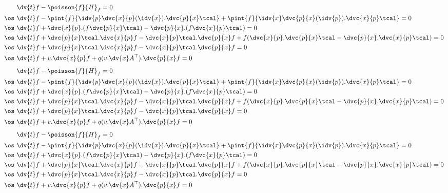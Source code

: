 \begin{align}
	        & \dv{t}f-\poisson{f}{H}_f=0                                                                                                 \\
\os\,\,         & \dv{t}f-\pint{f}{\idv{p}\dvc{x}{p}(\idv{x}).\dvc{p}{x}\tcal}+\pint{f}{\idv{x}\dvc{p}{x}(\idv{p}).\dvc{x}{p}\tcal}=0        \\
\os\,\,         & \dv{t}f+\dvc{x}{p}.(f\dvc{p}{x}\tcal)-\dvc{p}{x}.(f\dvc{x}{p}\tcal)=0                                                      \\
\os\,\,         & \dv{t}f+\dvc{p}{x}\tcal.\dvc{x}{p}f-\dvc{x}{p}\tcal.\dvc{p}{x}f+f(\dvc{x}{p}.\dvc{p}{x}\tcal-\dvc{p}{x}.\dvc{x}{p}\tcal)=0 \\
\os\,\,         & \dv{t}f+\dvc{p}{x}\tcal.\dvc{x}{p}f-\dvc{x}{p}\tcal.\dvc{p}{x}f=0                                                          \\
\os\,\,         & \dv{t}f+v.\dvc{x}{p}f+q(v.\dv{x}A^\top).\dvc{p}{x}f=0
\end{align}
\begin{align}
	        & \dv{t}f-\poisson{f}{H}_f=0                                                                                                 \\
\os\,\,         & \dv{t}f-\pint{f}{\idv{p}\dvc{x}{p}(\idv{x}).\dvc{p}{x}\tcal}+\pint{f}{\idv{x}\dvc{p}{x}(\idv{p}).\dvc{x}{p}\tcal}=0        \\
\os\,\,         & \dv{t}f+\dvc{x}{p}.(f\dvc{p}{x}\tcal)-\dvc{p}{x}.(f\dvc{x}{p}\tcal)=0                                                      \\
\os\,\,         & \dv{t}f+\dvc{p}{x}\tcal.\dvc{x}{p}f-\dvc{x}{p}\tcal.\dvc{p}{x}f+f(\dvc{x}{p}.\dvc{p}{x}\tcal-\dvc{p}{x}.\dvc{x}{p}\tcal)=0 \\
\os\,\,         & \dv{t}f+\dvc{p}{x}\tcal.\dvc{x}{p}f-\dvc{x}{p}\tcal.\dvc{p}{x}f=0                                                          \\
\os\,\,         & \dv{t}f+v.\dvc{x}{p}f+q(v.\dv{x}A^\top).\dvc{p}{x}f=0
\end{align}
\begin{align}
	        & \dv{t}f-\poisson{f}{H}_f=0                                                                                                 \\
\os\,\,         & \dv{t}f-\pint{f}{\idv{p}\dvc{x}{p}(\idv{x}).\dvc{p}{x}\tcal}+\pint{f}{\idv{x}\dvc{p}{x}(\idv{p}).\dvc{x}{p}\tcal}=0        \\
\os\,\,         & \dv{t}f+\dvc{x}{p}.(f\dvc{p}{x}\tcal)-\dvc{p}{x}.(f\dvc{x}{p}\tcal)=0                                                      \\
\os\,\,         & \dv{t}f+\dvc{p}{x}\tcal.\dvc{x}{p}f-\dvc{x}{p}\tcal.\dvc{p}{x}f+f(\dvc{x}{p}.\dvc{p}{x}\tcal-\dvc{p}{x}.\dvc{x}{p}\tcal)=0 \\
\os\,\,         & \dv{t}f+\dvc{p}{x}\tcal.\dvc{x}{p}f-\dvc{x}{p}\tcal.\dvc{p}{x}f=0                                                          \\
\os\,\,         & \dv{t}f+v.\dvc{x}{p}f+q(v.\dv{x}A^\top).\dvc{p}{x}f=0
\end{align}
